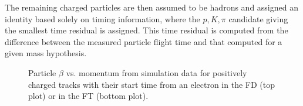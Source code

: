     The remaining charged particles are then assumed to be hadrons and assigned an identity based solely on timing information, where the $p,K,\pi$ candidate giving the smallest time residual is assigned. 
    This time residual is computed from the difference between the measured particle flight time and that computed for a given mass hypothesis.

    \begin{figure}
        \centering{}
        \caption[Particle $\beta$ vs. momentum for positively charged tracks.]{Particle $\beta$ vs. momentum from simulation data for positively charged tracks with their start time from an electron in the FD (top plot) or in the FT (bottom plot).}
        \label{fig::pos_pid}
    \end{figure}

